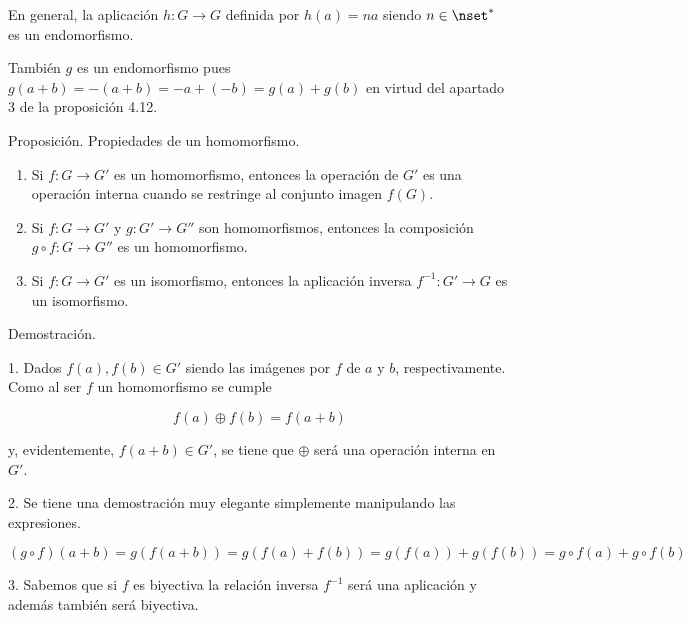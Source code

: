 En general, la aplicación $h: G \longrightarrow G$ definida por $h(a) = na$
siendo $n \in \nset^*$ es un endomorfismo.

También $g$ es un endomorfismo pues $g(a + b) = {-(a + b)} = -a + ({-b}) =
g(a) + g(b)$ en virtud del apartado 3 de la proposición 4.12.

Proposición. Propiedades de un homomorfismo.

\begin{enumerate}
  \item Si $f: G \longrightarrow G'$ es un homomorfismo, entonces la
    operación de $G'$ es una operación interna cuando se restringe al
    conjunto imagen $f(G)$.




  \item Si $f: G \longrightarrow G'$ y $g: G' \longrightarrow G''$ son
    homomorfismos, entonces la composición $g \circ f: G \longrightarrow
    G''$ es un homomorfismo.

  \item Si $f: G \longrightarrow G'$ es un isomorfismo, entonces la
    aplicación inversa $f^{-1}: G' \longrightarrow G$ es un isomorfismo.
\end{enumerate}


Demostración.

1. Dados $f(a), f(b) \in G'$ siendo las imágenes por $f$ de $a$ y $b$,
respectivamente. Como al ser $f$ un homomorfismo se cumple

$$ f(a) \oplus f(b) = f(a + b) $$

\noindent y, evidentemente, $f(a + b) \in G'$, se tiene que $\oplus$ será
una operación interna en $G'$.

2. Se tiene una demostración muy elegante simplemente manipulando las
expresiones.

$$ (g \circ f)(a + b) = g(f(a + b)) = g(f(a) + f(b)) = g(f(a)) + g(f(b)) = g
\circ f(a) + g \circ f(b) $$

3. Sabemos que si $f$ es biyectiva la relación inversa $f^{-1}$ será una
aplicación y además también será biyectiva.


